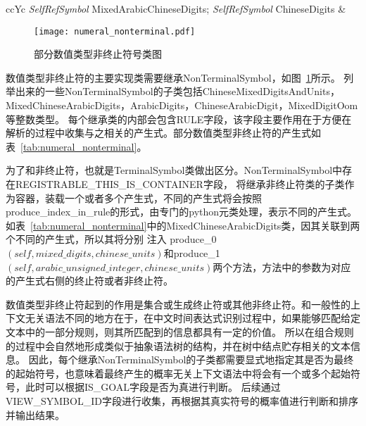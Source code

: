 \begin{table}[b]
\begin{tabularx}{\linewidth}{ccYc}
        \textit{SelfRefSymbol} \rightarrow  MixedArabicChineseDigits;
        \textit{SelfRefSymbol} \rightarrow  ChineseDigits &                                                                                                                                                                          \\
        \bottomrule
    \end{tabularx}
    \label{tab:numeral_nonterminal}
\end{table}

\begin{figure}[hbt]
    \centering
    \texttt{[image: numeral\_nonterminal.pdf]}
    \caption{部分数值类型非终止符号类图}
    \label{fig:numeral_nonterminal}
\end{figure}

数值类型非终止符的主要实现类需要继承NonTerminalSymbol，如图~\ref{fig:numeral_nonterminal}所示。
列举出来的一些NonTerminalSymbol的子类包括ChineseMixedDigitsAndUnits，MixedChineseArabicDigits，ArabicDigits，ChineseArabicDigit，MixedDigitOom等整数类型。
每个继承类的内部会包含RULE字段，该字段主要作用在于方便在解析的过程中收集与之相关的产生式。部分数值类型非终止符的产生式如表~\ref{tab:numeral_nonterminal}。

为了和非终止符，也就是TerminalSymbol类做出区分。NonTerminalSymbol中存在REGISTRABLE\_THIS\_IS\_CONTAINER字段，
将继承非终止符类的子类作为容器，装载一个或者多个产生式，不同的产生式将会按照
produce\_index\_in\_rule的形式，由专门的python元类处理，表示不同的产生式。如表~\ref{tab:numeral_nonterminal}中的MixedChineseArabicDigits类，因其关联到两个不同的产生式，所以其将分别
注入 produce\_0$\left(self,mixed\_digits,chinese\_units\right)$和produce\_1$\left(self,arabic\_unsigned\_integer,chinese\_units\right)$两个方法，方法中的参数为对应的产生式右侧的终止符或者非终止符。

数值类型非终止符起到的作用是集合或生成终止符或其他非终止符。和一般性的上下文无关语法不同的地方在于，在中文时间表达式识别过程中，如果能够匹配给定文本中的一部分规则，则其所匹配到的信息都具有一定的价值。
所以在组合规则的过程中会自然地形成类似于抽象语法树的结构，并在树中结点贮存相关的文本信息。
因此，每个继承NonTerminalSymbol的子类都需要显式地指定其是否为最终的起始符号，也意味着最终产生的概率无关上下文语法中将会有一个或多个起始符号，此时可以根据IS\_GOAL字段是否为真进行判断。
后续通过VIEW\_SYMBOL\_ID字段进行收集，再根据其真实符号的概率值进行判断和排序并输出结果。

